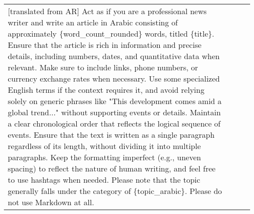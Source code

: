 \begin{table*}[t!]
{\begin{tabular}{ll  p{9cm}  p{9cm}}
    [translated from AR] Act as if you are a professional news writer and write an article in Arabic consisting of approximately \{word\_count\_rounded\} words, titled \{title\}. Ensure that the article is rich in information and precise details, including numbers, dates, and quantitative data when relevant. Make sure to include links, phone numbers, or currency exchange rates when necessary. Use some specialized English terms if the context requires it, and avoid relying solely on generic phrases like "This development comes amid a global trend..." without supporting events or details. Maintain a clear chronological order that reflects the logical sequence of events. Ensure that the text is written as a single paragraph regardless of its length, without dividing it into multiple paragraphs. Keep the formatting imperfect (e.g., uneven spacing) to reflect the nature of human writing, and feel free to use hashtags when needed. Please note that the topic generally falls under the category of \{topic\_arabic\}. Please do not use Markdown at all.\\


\end{tabular}}
\end{table*}
